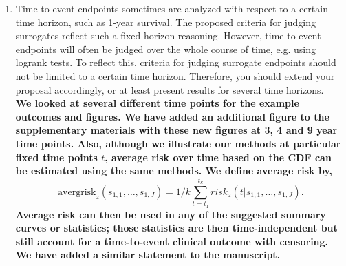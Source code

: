 \documentclass[11pt]{article} %
\begin{document}
\begin{enumerate}
\item Time-to-event endpoints sometimes are analyzed with respect to a certain time horizon, such as 1-year survival. The proposed criteria for judging surrogates reflect such a fixed horizon reasoning. However, time-to-event endpoints will often be judged over the whole course of time, e.g. using logrank tests. To reflect this, criteria for judging surrogate endpoints should not be limited to a certain time horizon. Therefore, you should extend your proposal accordingly, or at least present results for several time horizons.\\
\textbf{We looked at several different time points for the example outcomes and figures. We have added an additional figure to the supplementary materials with these new figures at 3, 4 and 9 year time points. Also, although we illustrate our methods at particular fixed time points $t$, average risk over time based on the CDF can be estimated using the same methods. We define average risk by, 
\[
\mbox{avergrisk}_{z}(s_{1,1}, \ldots, s_{1,J}) = 1/k \sum_{t=t_1}^{t_k}{risk_{z}(t|s_{1,1}, \ldots, s_{1,J})}.
\]
Average risk can then be used in any of the suggested summary curves or statistics; those statistics are then time-independent but still account for a time-to-event clinical outcome with censoring. We have added a similar statement to the manuscript.}
\end{enumerate}
\end{document}
